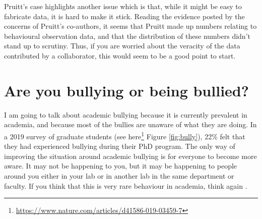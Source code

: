 \documentclass[
]{krantz}
\renewcommand{\href}[2]{#2\footnote{\url{#1}}}
\begin{document}
Pruitt's case highlights another issue which is that, while it might be easy to fabricate data, it is hard to make it stick. Reading the evidence posted by the concerns of Pruitt's co-authors, it seems that Pruitt made up numbers relating to behavioural observation data, and that the distribution of these numbers didn't stand up to scrutiny. Thus, if you are worried about the veracity of the data contributed by a collaborator, this would seem to be a good point to start.

\hypertarget{bullying}{%
\chapter{Are you bullying or being bullied?}\label{bullying}}

I am going to talk about academic bullying because it is currently prevalent in academia, and because most of the bullies are unaware of what they are doing. In a 2019 survey of graduate students (see \href{https://www.nature.com/articles/d41586-019-03459-7}{here} Figure \ref{fig:bully}), 22\% felt that they had experienced bullying during their PhD program. The only way of improving the situation around academic bullying is for everyone to become more aware. It may not be happening to you, but it may be happening to people around you either in your lab or in another lab in the same department or faculty. If you think that this is very rare behaviour in academia, think again \citep{devlin2018hundreds}.
\end{document}
